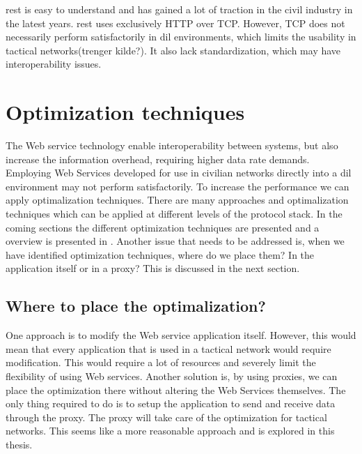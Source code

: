  \gls{rest} is easy to understand and has gained a lot of traction in the civil
 industry in the latest years. \gls{rest} uses exclusively HTTP over TCP.
 However, TCP does not necessarily perform satisfactorily in \gls{dil}
 environments, which limits the usability in tactical networks(trenger kilde?). It also lack standardization, which may have interoperability issues.


\section{Optimization techniques}
The Web service technology enable interoperability between systems, but also
increase the information overhead, requiring higher data rate demands. Employing
Web Services developed for use in civilian networks directly into a \gls{dil}
environment may not perform satisfactorily. To increase the performance we can
apply optimalization techniques. There are many approaches and optimalization
techniques which can be applied at different levels of the protocol stack. In
the coming sections the different optimization techniques are presented and a
overview is presented in . Another issue
that needs to be addressed is, when we have identified optimization techniques,
where do we place them? In the application itself or in a proxy? This is
discussed in the next section.

\subsection{Where to place the optimalization?}
One approach is to modify the Web service application itself. However, this
would mean that every application that is used in a tactical network would
require modification. This would require a lot of resources and severely limit
the flexibility of using Web services. Another solution is, by using proxies, we
can place the optimization there without altering the Web Services themselves.
The only thing required to do is to setup the application to send and receive
data through the proxy. The proxy will take care of the optimization for
tactical networks. This seems like a more reasonable approach and is explored in
this thesis.



